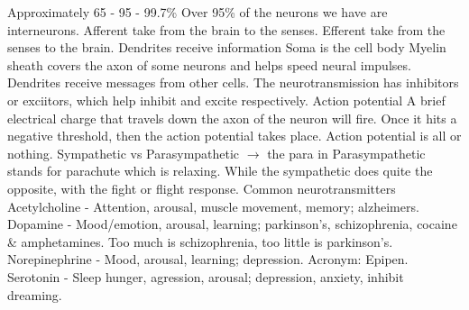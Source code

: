 {}Approximately 65 - 95 - 99.7\%\markdownRendererInterblockSeparator
{}\markdownRendererInterblockSeparator
{}\markdownRendererUlBeginTight
\markdownRendererUlItem Over 95\% of the neurons we have are interneurons.\markdownRendererUlItemEnd 
\markdownRendererUlItem Afferent take from the brain to the senses.\markdownRendererUlItemEnd 
\markdownRendererUlItem Efferent take from the senses to the brain.\markdownRendererUlItemEnd 
\markdownRendererUlItem Dendrites receive information\markdownRendererUlItemEnd 
\markdownRendererUlItem Soma is the cell body\markdownRendererUlItemEnd 
\markdownRendererUlItem Myelin sheath covers the axon of some neurons and helps speed neural impulses.\markdownRendererUlItemEnd 
\markdownRendererUlItem Dendrites receive messages from other cells.\markdownRendererUlItemEnd 
\markdownRendererUlItem The neurotransmission has inhibitors or exciitors, which help inhibit and excite respectively.\markdownRendererUlItemEnd 
\markdownRendererUlItem Action potential\markdownRendererInterblockSeparator
{}\markdownRendererUlBeginTight
\markdownRendererUlItem A brief electrical charge that travels down the axon of the neuron will fire.\markdownRendererUlItemEnd 
\markdownRendererUlItem Once it hits a negative threshold, then the action potential takes place.\markdownRendererUlItemEnd 
\markdownRendererUlItem Action potential is all or nothing.\markdownRendererUlItemEnd 
\markdownRendererUlEndTight \markdownRendererUlItemEnd 
\markdownRendererUlEndTight \markdownRendererInterblockSeparator
{}\markdownRendererInterblockSeparator
{}\markdownRendererUlBegin
\markdownRendererUlItem Sympathetic vs Parasympathetic $\rightarrow$ the para in Parasympathetic stands for parachute which is relaxing. While the sympathetic does quite the opposite, with the fight or flight response.\markdownRendererUlItemEnd 
\markdownRendererUlItem Common neurotransmitters\markdownRendererInterblockSeparator
{}\markdownRendererUlBeginTight
\markdownRendererUlItem Acetylcholine - Attention, arousal, muscle movement, memory; alzheimers.\markdownRendererUlItemEnd 
\markdownRendererUlItem Dopamine - Mood/emotion, arousal, learning; parkinson's, schizophrenia, cocaine & amphetamines. Too much is schizophrenia, too little is parkinson's.\markdownRendererUlItemEnd 
\markdownRendererUlItem Norepinephrine - Mood, arousal, learning; depression. Acronym: Epipen.\markdownRendererUlItemEnd 
\markdownRendererUlItem Serotonin - Sleep hunger, agression, arousal; depression, anxiety, inhibit dreaming.\markdownRendererUlItemEnd 
